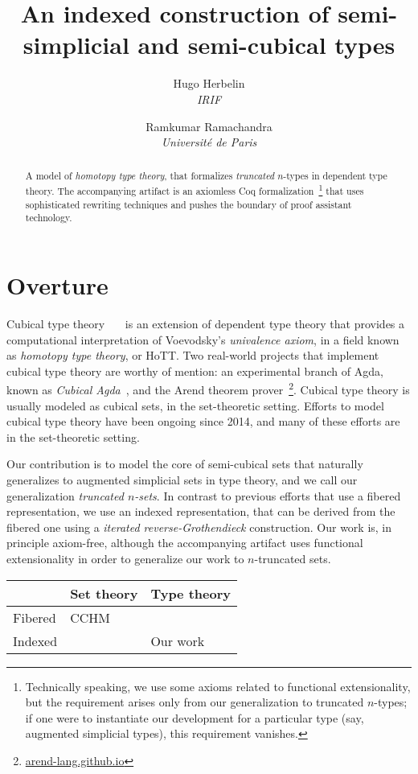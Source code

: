 \documentclass[10pt]{art}
\title{An indexed construction of semi-simplicial and semi-cubical types}
\author{
  \textcolor{gray80}{Hugo Herbelin} \\
  \itshape \textcolor{gray80}{IRIF}
  \and
  \textcolor{gray80}{Ramkumar Ramachandra} \\
  \itshape \textcolor{gray80}{Université de Paris}
}
\date{}
\begin{document}
\thispagestyle{empty}
\maketitle
\begin{abstract}
  A model of \emph{homotopy type theory}, that formalizes \emph{truncated} $n$-types in dependent type theory. The accompanying artifact is an axiomless Coq formalization~\footnote{Technically speaking, we use some axioms related to functional extensionality, but the requirement arises only from our generalization to truncated $n$-types; if one were to instantiate our development for a particular type (say, augmented simplicial types), this requirement vanishes.} that uses sophisticated rewriting techniques and pushes the boundary of proof assistant technology.
\end{abstract}
\tableofcontents
\newpage

\section{Overture}
Cubical type theory~\cite{Bezem14}~\cite{Cohen16}~\cite{Angiuli17} is an extension of dependent type theory that provides a computational interpretation of Voevodsky's \emph{univalence axiom}, in a field known as \emph{homotopy type theory}, or HoTT. Two real-world projects that implement cubical type theory are worthy of mention: an experimental branch of Agda, known as \emph{Cubical Agda}~\cite{Vezzosi21}, and the Arend theorem prover~\footnote{\href{https://arend-lang.github.io}{arend-lang.github.io}}. Cubical type theory is usually modeled as cubical sets, in the set-theoretic setting. Efforts to model cubical type theory have been ongoing since 2014, and many of these efforts are in the set-theoretic setting.

Our contribution is to model the core of semi-cubical sets that naturally generalizes to augmented simplicial sets in type theory, and we call our generalization \emph{truncated $n$-sets}. In contrast to previous efforts that use a fibered representation, we use an indexed representation, that can be derived from the fibered one using a \emph{iterated reverse-Grothendieck} construction. Our work is, in principle axiom-free, although the accompanying artifact uses functional extensionality in order to generalize our work to $n$-truncated sets.

\begin{table}[H]
  \begin{tabularx}{\linewidth}{p{.3\linewidth}|p{.3\linewidth}|p{.3\linewidth}}
    \toprule
            & Set theory & Type theory \\
    \midrule
    Fibered & CCHM       &             \\
    \midrule
    Indexed &            & Our work    \\
    \bottomrule
  \end{tabularx}
\end{table}
\end{document}
